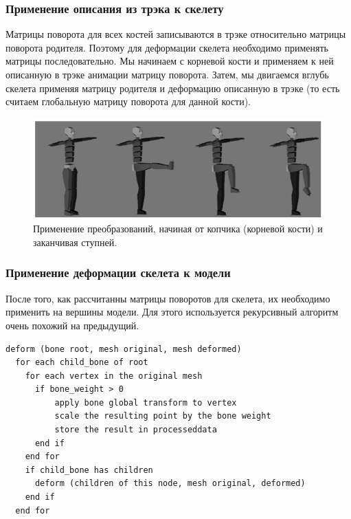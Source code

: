\documentclass{beamer}
\begin{document}
\begin{frame}
\frametitle{Применение описания из трэка к скелету}
\begin{scriptsize}
    Матрицы поворота для всех костей записываются в трэке относительно матрицы поворота родителя.
Поэтому для деформации скелета необходимо применять матрицы последовательно.
Мы начинаем с корневой кости и применяем к ней описанную в трэке анимации матрицу поворота.
Затем, мы двигаемся вглубь скелета применяя матрицу родителя и деформацию описанную в трэке (то есть считаем глобальную матрицу поворота для данной кости).
    
\begin{figure}[h!]
    \centering
    \includegraphics[width=1\textwidth]{forward_kinematics.png}
    \caption{\scriptsize{Применение преобразований, начиная от копчика (корневой кости) и заканчивая ступней.}}
\end{figure}

\end{scriptsize}
\end{frame}


\begin{frame}[fragile]
\frametitle{Применение деформации скелета к модели}

После того, как рассчитанны матрицы поворотов для скелета, их необходимо применить на вершины модели. Для этого используется рекурсивный алгоритм очень похожий на предыдущий.

\begin{scriptsize}
\begin{lstlisting}
deform (bone root, mesh original, mesh deformed)
  for each child_bone of root
    for each vertex in the original mesh
      if bone_weight > 0
          apply bone global transform to vertex
          scale the resulting point by the bone weight
          store the result in processeddata
      end if
    end for
    if child_bone has children
      deform (children of this node, mesh original, deformed)
    end if
  end for
\end{lstlisting}
\end{scriptsize}


\end{frame}
\end{document}
